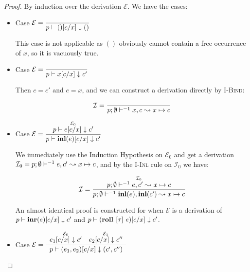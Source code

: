 \begin{proof}

  By induction over the derivation $\mathcal{E}$. We have the cases:

  \begin{itemize}
    \setlength\itemsep{1em}

    \item Case $\mathcal{E} =
      \dfrac
        {}
        {p \vdash ()[c / x] \downarrow ()}$

        This case is not applicable as $()$ obviously cannot contain a free
        occurrence of $x$, so it is vacuously true.

    \item Case $\mathcal{E} =
      \dfrac
        {}
        {p \vdash x[c / x] \downarrow c'}$

      Then $c = c'$ and $e = x$, and we can construct a derivation directly by
      \textsc{I-Bind}:

      \begin{align*}
        \mathcal{I} = \dfrac
          {}
          {p;\emptyset\vdash^{-1} x, c \leadsto x \mapsto c}
      \end{align*}

    \item Case $\mathcal{E} =
      \dfrac
        {\overset
           {\mathcal{E}_0}
           {p \vdash e [c / x] \downarrow c'}
        }
        {p \vdash \textbf{inl}(e)[c / x] \downarrow c'}$

      We immediately use the Induction Hypothesis on $\mathcal{E}_0$ and get a
      derivation $\mathcal{I}_0 = p;\emptyset\vdash^{-1} e, c' \leadsto x \mapsto c$, and by
      the \textsc{I-Inl} rule on $\mathcal{I}_0$ we have:

      \begin{align*}
        \mathcal{I} = \dfrac
          {\overset
            {\mathcal{I}_0}
            {p;\emptyset\vdash^{-1} e, c' \leadsto x \mapsto c}
          }
          {p;\emptyset\vdash^{-1} \textbf{inl}(e), \textbf{inl}(c') \leadsto x \mapsto c}
      \end{align*}

      An almost identical proof is constructed for when $\mathcal{E}$ is a
      derivation of $p \vdash \textbf{inr}(e)[c / x] \downarrow c'$ and $p \vdash
      (\textbf{roll } [\tau]\ e) [c / x] \downarrow c'$.

    \item Case $\mathcal{E} =
      \dfrac
        {\begin{array}{cc}
            \overset
              {\mathcal{E}_0}
              {e_1 [c / x] \downarrow c'} &
            \overset
              {\mathcal{E}_1}
              {e_2 [c / x] \downarrow c''}
         \end{array}
        }
        {p \vdash (e_1, e_2) [c / x] \downarrow (c', c'')}$


\end{itemize}
\end{proof}
